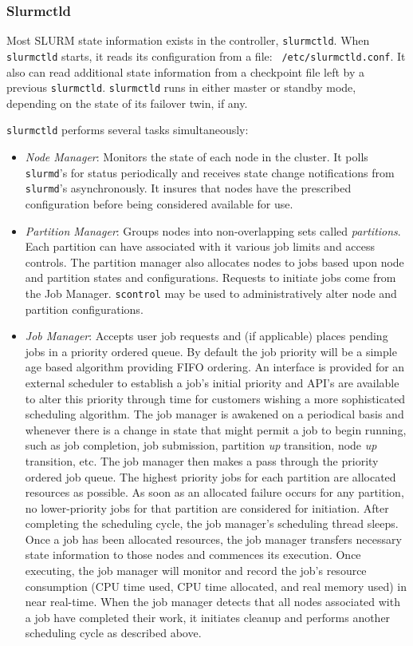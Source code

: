 \subsubsection{Slurmctld}

Most SLURM state information exists in the controller, {\tt slurmctld}.
When {\tt slurmctld} starts, it reads its configuration from a file: {\tt
/etc/slurmctld.conf}.  It also can read additional state information
from a checkpoint file left by a previous {\tt slurmctld}.
{\tt slurmctld} runs in either master or standby mode, depending on the
state of its failover twin, if any.

{\tt slurmctld} performs several tasks simultaneously:

\begin{itemize}
\item {\em Node Manager}: Monitors the state of each node in
the cluster.  It polls {\tt slurmd}'s for status periodically and
receives state change notifications from {\tt slurmd}'s asynchronously.
It insures that nodes have the prescribed configuration before being 
considered available for use.

\item {\em Partition Manager}: Groups nodes into non-overlapping sets called
{\em partitions}. Each partition can have associated with it various job
limits and access controls.  The partition manager also allocates nodes
to jobs based upon node and partition states and configurations. Requests
to initiate jobs come from the Job Manager.  {\tt scontrol} may be used
to administratively alter node and partition configurations.

\item {\em Job Manager}: Accepts user job requests and (if applicable)
places pending jobs in a priority ordered queue. By default the job
priority will be a simple age based algorithm providing FIFO ordering.
An interface is provided for an external scheduler to establish a job's
initial priority and API's are available to alter this priority through
time for customers wishing a more sophisticated scheduling algorithm.
The job manager is awakened on a periodical basis and whenever there
is a change in state that might permit a job to begin running, such
as job completion, job submission, partition {\em up} transition,
node {\em up} transition, etc.  The job manager then makes a pass
through the priority ordered job queue. The highest priority jobs 
for each partition are allocated resources as possible. As soon as an 
allocated failure occurs for any partition, no lower-priority jobs for 
that partition are considered for initiation. 
After completing the scheduling cycle, the job manager's scheduling
thread sleeps.  Once a job has been allocated resources, the job manager
transfers necessary state information to those nodes and commences
its execution.  Once executing, the job manager will monitor and record
the job's resource consumption (CPU time used, CPU time allocated, and
real memory used) in near real-time.  When the job manager detects that
all nodes associated with a job have completed their work, it initiates
cleanup and performs another scheduling cycle as described above.


\end{itemize}
